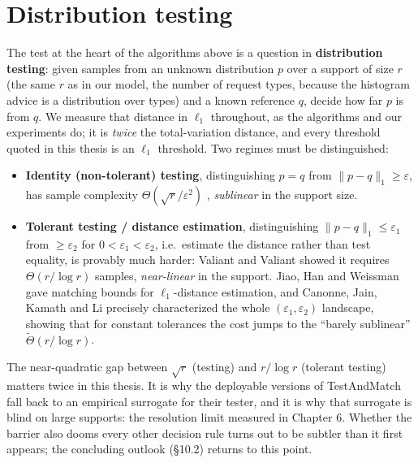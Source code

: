\section{Distribution testing}

The test at the heart of the algorithms above is a question in
\textbf{distribution testing}: given samples from an unknown
distribution \(p\) over a support of size \(r\) (the same \(r\) as in
our model, the number of request types, because the histogram advice is
a distribution over types) and a known reference \(q\), decide how far
\(p\) is from \(q\). We measure that distance in \(\ell_1\) throughout,
as the algorithms and our experiments do; it is \emph{twice} the
total-variation distance, and every threshold quoted in this thesis is
an \(\ell_1\) threshold. Two regimes must be distinguished:

\begin{itemize}
\tightlist
\item
  \textbf{Identity (non-tolerant) testing}, distinguishing \(p=q\) from
  \(\lVert p-q\rVert_1\ge
  \varepsilon\), has sample complexity \(\Theta(\sqrt r/\varepsilon^2)\)
  \autocite{paninski2008coincidence,valiant2017automatic},
  \emph{sublinear} in the support size.
\item
  \textbf{Tolerant testing / distance estimation}, distinguishing
  \(\lVert p-q\rVert_1\le
  \varepsilon_1\) from \(\ge\varepsilon_2\) for
  \(0<\varepsilon_1<\varepsilon_2\), i.e.~estimate the distance rather
  than test equality, is provably much harder: Valiant and Valiant
  \autocite{valiant2011unseen} showed it requires \(\Theta(r/\log r)\)
  samples, \emph{near-linear} in the support. Jiao, Han and Weissman
  \autocite{jiao2018l1} gave matching bounds for \(\ell_1\)-distance
  estimation, and Canonne, Jain, Kamath and Li
  \autocite{canonne2022tolerance} precisely characterized the whole
  \((\varepsilon_1,\varepsilon_2)\) landscape, showing that for constant
  tolerances the cost jumps to the ``barely sublinear''
  \(\tilde\Theta(r/\log r)\).
\end{itemize}

The near-quadratic gap between \(\sqrt r\) (testing) and \(r/\log r\)
(tolerant testing) matters twice in this thesis. It is why the
deployable versions of TestAndMatch fall back to an empirical surrogate
for their tester, and it is why that surrogate is blind on large
supports: the resolution limit measured in Chapter 6. Whether the
barrier also dooms every other decision rule turns out to be subtler
than it first appears; the concluding outlook (§10.2) returns to this
point.

